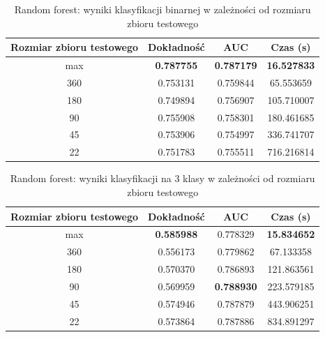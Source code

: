 \documentclass[a4paper, twoside, 11pt, openright]{article}
\begin{document}
\begin{table}[H]
    \centering
    \begin{tabular}{|c|c|c|c|}
    \hline
        \textbf{Rozmiar zbioru testowego} & \textbf{Dokładność} & \textbf{AUC} & \textbf{Czas (s)} \\ \hline
max                         &  \textbf{0.787755} &  \textbf{0.787179} &  \textbf{16.527833} \\ \hline
360                         &  0.753131 &  0.759844 &   65.553659 \\ \hline        
180                         &  0.749894 &  0.756907 &  105.710007 \\ \hline
90                          &  0.755908 &  0.758301 &  180.461685 \\ \hline
45                          &  0.753906 &  0.754997 &  336.741707 \\ \hline
22                          &  0.751783 &  0.755511 &  716.216814 \\ \hline
    \end{tabular}
    \caption{Random forest: wyniki klasyfikacji binarnej w zależności od rozmiaru zbioru testowego}
    \label{tab:rf_walk_forward_binary}
\end{table}

\begin{table}[H]
    \centering
    \begin{tabular}{|c|c|c|c|}
    \hline
        \textbf{Rozmiar zbioru testowego} & \textbf{Dokładność} & \textbf{AUC} & \textbf{Czas (s)} \\ \hline
max                         &  \textbf{0.585988} &  0.778329 &  \textbf{15.834652} \\ \hline
360                         &  0.556173 &  0.779862 &   67.133358 \\ \hline
180                         &  0.570370 &  0.786893 &  121.863561 \\ \hline
90                         &  0.569959 &  \textbf{0.788930} &  223.579185 \\ \hline
45                          &  0.574946 &  0.787879 &  443.906251 \\ \hline
22                          &  0.573864 &  0.787886 &  834.891297 \\ \hline
    \end{tabular}
    \caption{Random forest: wyniki klasyfikacji na 3 klasy w zależności od rozmiaru zbioru testowego}
    \label{tab:rf_walk_forward_discrete}
\end{table}
\end{document}

